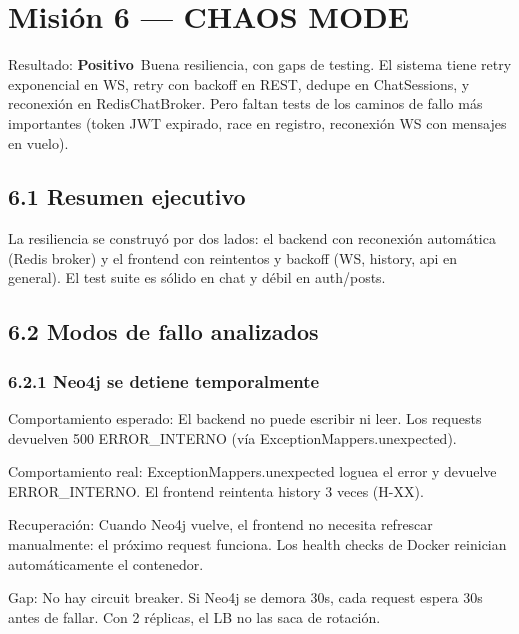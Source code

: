 \documentclass[10pt,a4paper]{article}
\newcommand{\badgePositivo}{\colorbox{green!20}{\textcolor{green!60!black}{\textbf{\footnotesize Positivo}}}}
\begin{document}
\section{Misión 6 --- CHAOS MODE}
Resultado: \badgePositivo\  Buena resiliencia, con gaps de testing. El sistema tiene retry exponencial en WS, retry con backoff en REST, dedupe en ChatSessions, y reconexión en RedisChatBroker. Pero faltan tests de los caminos de fallo más importantes (token JWT expirado, race en registro, reconexión WS con mensajes en vuelo).\par\vspace{0.4em}
\subsection{6.1 Resumen ejecutivo}
La resiliencia se construyó por dos lados: el backend con reconexión automática (Redis broker) y el frontend con reintentos y backoff (WS, history, api en general). El test suite es sólido en chat y débil en auth/posts.\par\vspace{0.4em}
\subsection{6.2 Modos de fallo analizados}
\subsubsection{6.2.1 Neo4j se detiene temporalmente}
Comportamiento esperado: El backend no puede escribir ni leer. Los requests devuelven 500 ERROR\_INTERNO (vía ExceptionMappers.unexpected).\par\vspace{0.4em}
Comportamiento real: ExceptionMappers.unexpected loguea el error y devuelve ERROR\_INTERNO. El frontend reintenta history 3 veces (H-XX).\par\vspace{0.4em}
Recuperación: Cuando Neo4j vuelve, el frontend no necesita refrescar manualmente: el próximo request funciona. Los health checks de Docker reinician automáticamente el contenedor.\par\vspace{0.4em}
Gap: No hay circuit breaker. Si Neo4j se demora 30s, cada request espera 30s antes de fallar. Con 2 réplicas, el LB no las saca de rotación.\par\vspace{0.4em}
\end{document}
